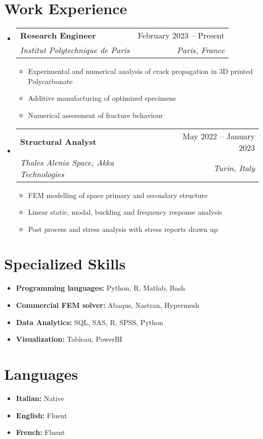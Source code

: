 \documentclass[letterpaper,11pt]{article}
\makeatletter
\newcommand{\resumeItem}[1]{
  \item{
    {#1 \vspace{-4pt}}
  }
}
\newcommand{\resumeSubheading}[4]{
  \vspace{-2pt}\item
    \begin{tabular*}{0.97\textwidth}[t]{l@{\extracolsep{\fill}}r}
      \textbf{#1} & #2 \\
      \textit{\small #3} & \textit{\small #4} \\
    \end{tabular*}\vspace{-10pt}
}
\newcommand{\resumeSubHeadingListStart}{\begin{itemize}[leftmargin=0.15in, label={}]}
\newcommand{\resumeSubHeadingListEnd}{\end{itemize}}
\newcommand{\resumeItemListStart}{\begin{itemize}}
\newcommand{\resumeItemListEnd}{\end{itemize}\vspace{-2pt}}
\makeatother
\begin{document}
\section{Work Experience} 
\resumeSubHeadingListStart
    \resumeSubheading
      {Research Engineer}{February 2023 -- Present}
      {Institut Polytechnique de Paris}{Paris, France}
      \resumeItemListStart
        \resumeItem{Experimental and numerical analysis of crack propagation in 3D printed Polycarbonate}
        \resumeItem{Additive manufacturing of optimized specimens}
        \resumeItem{Numerical assessment of fracture behaviour}
    \resumeItemListEnd

    \resumeSubheading
      {Structural Analyst}{May 2022 -- January 2023}
      {Thales Alenia Space, Akka Technologies}{Turin, Italy}
      \resumeItemListStart
        \resumeItem{FEM modelling of space primary and secondary structure}
        \resumeItem{Linear static, modal, buckling and frequency response analysis}
        \resumeItem{Post process and stress analysis with stress reports drawn up}
    \resumeItemListEnd
\resumeSubHeadingListEnd

\section{Specialized Skills}
\resumeSubHeadingListStart
    \resumeItem{
     \textbf{Programming languages:} Python, R, Matlab, Bash
    }
    \resumeItem{
     \textbf{Commercial FEM solver:} Abaqus, Nastran, Hypermesh
    }
    \resumeItem{
     \textbf{Data Analytics:} SQL, SAS, R, SPSS, Python
    }
    \resumeItem{
     \textbf{Visualization:} Tableau, PowerBI
    }
\resumeSubHeadingListEnd

\section{Languages}
\resumeSubHeadingListStart
    \resumeItem{
     \textbf{Italian:} Native
    }
    \resumeItem{
     \textbf{English:} Fluent
    }
    \resumeItem{
     \textbf{French:} Fluent
    }
\resumeSubHeadingListEnd
\end{document}
